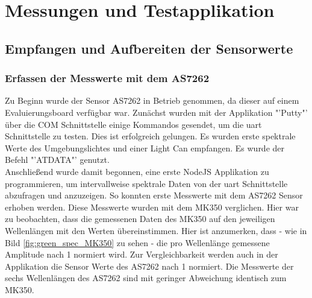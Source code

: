 \documentclass[11pt]{scrartcl}
\begin{document}
\section{Messungen und Testapplikation}
\subsection{Empfangen und Aufbereiten der Sensorwerte}
\subsubsection{Erfassen der Messwerte mit dem AS7262} \label{measureWithAS7262}
Zu Beginn wurde der Sensor AS7262 in Betrieb genommen, da dieser auf einem Evaluierungsboard verfügbar war.
Zunächst wurden mit der Applikation "'Putty"' über die COM Schnittstelle einige Kommandos gesendet, um die
\ac{uart} Schnittstelle zu testen. Dies ist erfolgreich gelungen. Es wurden erste spektrale Werte des
Umgebungslichtes und einer Light Can empfangen. Es wurde der Befehl "'ATDATA"' genutzt.\\
Anschließend wurde damit begonnen, eine erste NodeJS Applikation zu programmieren, um intervallweise spektrale Daten
von der \ac{uart} Schnittstelle abzufragen und anzuzeigen. So konnten erste Messwerte mit dem AS7262 Sensor erhoben werden.
Diese Messwerte wurden mit dem MK350 verglichen. Hier war zu beobachten, dass die gemessenen Daten des MK350 auf den jeweiligen
Wellenlängen mit den Werten übereinstimmen. Hier ist anzumerken, dass - wie in Bild \ref{fig:green_spec_MK350} zu sehen - die pro Wellenlänge
gemessene Amplitude nach 1 normiert wird. Zur Vergleichbarkeit werden auch in der Applikation die Sensor Werte des AS7262 nach
1 normiert. Die Messwerte der sechs Wellenlängen des AS7262 sind mit geringer Abweichung identisch zum MK350.\\
\end{document}
